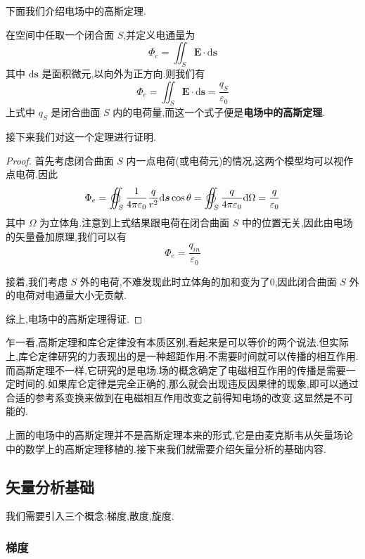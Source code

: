 \documentclass[UTF8]{ctexbook}
\newcommand{\vp}{\varepsilon_0}
\newcommand{\D}{\text{d}}
\begin{document}
下面我们介绍电场中的高斯定理.

\begin{theorem}
    在空间中任取一个闭合面 $S$,并定义电通量为
    \begin{equation}
        \Phi_e=\iint_S \boldsymbol{E} \cdot \D \boldsymbol{s}
    \end{equation}
    其中 $\D \boldsymbol{s}$ 是面积微元,以向外为正方向.则我们有
    \begin{equation}
        \Phi_e=\iint_S \boldsymbol{E} \cdot \D \boldsymbol{s}=\frac{q_S}{\vp}
    \end{equation}
    上式中 $q_S$ 是闭合曲面 $S$ 内的电荷量,而这一个式子便是\textbf{电场中的高斯定理}.
\end{theorem}

接下来我们对这一个定理进行证明.

\begin{proof}
    首先考虑闭合曲面 $S$ 内一点电荷(或电荷元)的情况,这两个模型均可以视作点电荷.因此
    \[\Phi_e = \varoiint_S \frac{1}{4\pi\vp} \frac{q}{r^2} \D \boldsymbol{s} \cos \theta = \varoiint_S \frac{q}{4\pi\vp} \D \Omega = \frac{q}{\vp}\]
    其中 $\Omega$ 为立体角.注意到上式结果跟电荷在闭合曲面 $S$ 中的位置无关,因此由电场的矢量叠加原理,我们可以有
    \[\Phi_e = \frac{q_{in}}{\vp}\]
    
    接着,我们考虑 $S$ 外的电荷,不难发现此时立体角的加和变为了0,因此闭合曲面 $S$ 外的电荷对电通量大小无贡献.

    综上,电场中的高斯定理得证.
\end{proof}

乍一看,高斯定理和库仑定律没有本质区别,看起来是可以等价的两个说法.但实际上,库仑定律研究的力表现出的是一种超距作用:不需要时间就可以传播的相互作用.而高斯定理不一样,它研究的是电场.场的概念确定了电磁相互作用的传播是需要一定时间的.如果库仑定律是完全正确的,那么就会出现违反因果律的现象,即可以通过合适的参考系变换来做到在电磁相互作用改变之前得知电场的改变.这显然是不可能的.

上面的电场中的高斯定理并不是高斯定理本来的形式,它是由麦克斯韦从矢量场论中的数学上的高斯定理移植的.接下来我们就需要介绍矢量分析的基础内容.

\subsection{矢量分析基础}

我们需要引入三个概念:梯度,散度,旋度.

\subsubsection{梯度}
\end{document}
